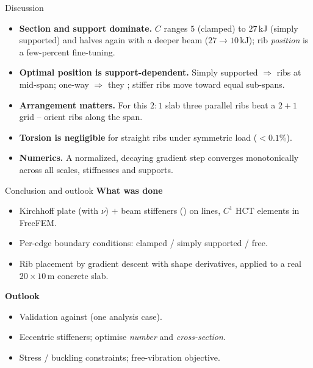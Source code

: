 \begin{frame}{Discussion}
  \begin{itemize}
    \item \textbf{Section and support dominate.} $C$ ranges $5$ (clamped) to
          $27$\,kJ (simply supported) and halves again with a deeper beam
          ($27\to10$\,kJ); rib \emph{position} is a few-percent fine-tuning.
    \item \textbf{Optimal position is support-dependent.} Simply supported
          $\Rightarrow$ ribs  at mid-span; one-way
          $\Rightarrow$ they ; stiffer ribs move toward equal
          sub-spans.
    \item \textbf{Arrangement matters.} For this $2{:}1$ slab three parallel ribs
          beat a $2{+}1$ grid -- orient ribs along the span.
    \item \textbf{Torsion is negligible} for straight ribs under symmetric load
          ($<0.1\%$).
    \item \textbf{Numerics.} A normalized, decaying gradient step converges
          monotonically across all scales, stiffnesses and supports.
  \end{itemize}
\end{frame}

\begin{frame}{Conclusion and outlook}
  \textbf{What was done}
  \begin{itemize}
    \item Kirchhoff plate (with $\nu$) $+$ beam stiffeners () on lines, $C^1$ HCT elements in FreeFEM.
    \item Per-edge boundary conditions: clamped / simply supported / free.
    \item Rib placement by gradient descent with  shape
          derivatives, applied to a real $20\times10$\,m concrete slab.
  \end{itemize}
  \medskip
  \textbf{Outlook}
  \begin{itemize}
    \item Validation against  (one analysis case).
    \item Eccentric stiffeners; optimise \emph{number} and \emph{cross-section}.
    \item Stress / buckling constraints; free-vibration objective.
  \end{itemize}
  \vfill
\end{frame}
